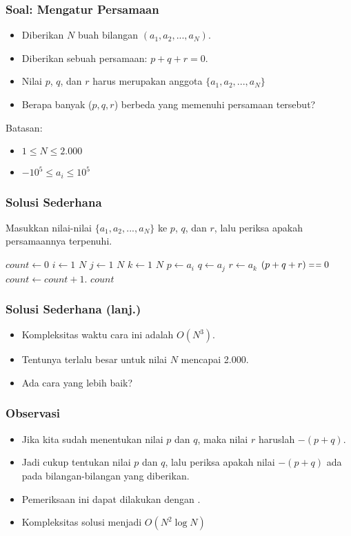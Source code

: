 \begin{frame}
\frametitle{Soal: Mengatur Persamaan}
\begin{itemize}
  \item Diberikan $N$ buah bilangan $(a_1, a_2, ..., a_N)$.
  \item Diberikan sebuah persamaan: $p + q + r = 0$.
  \item Nilai $p$, $q$, dan $r$ harus merupakan anggota $\{ a_1, a_2, ..., a_N \}$
  \item Berapa banyak ($p, q, r$) berbeda yang memenuhi persamaan tersebut?
\end{itemize}

Batasan:
\begin{itemize} 
  \item $1 \leq N \leq 2.000$
  \item $-10^5 \leq a_i \leq 10^5$
\end{itemize}
\end{frame}

\begin{frame}
\frametitle{Solusi Sederhana}
Masukkan nilai-nilai $\{ a_1, a_2, ..., a_N \}$ ke $p$, $q$, dan $r$, lalu periksa apakah persamaannya terpenuhi.

\begin{codebox}
\li $count \gets 0$
\li \For $i \gets 1$ \To $N$ \Do
\li   \For $j \gets 1$ \To $N$ \Do
\li     \For $k \gets 1$ \To $N$ \Do
\li       $p \gets a_i$
\li       $q \gets a_j$
\li       $r \gets a_k$
\li       \If $(p + q + r) \isequal 0$ \Then
\li         $count \gets count + 1$.
          \End
        \End
      \End
    \End
\li \Return $count$
\end{codebox}
\end{frame}

\begin{frame}
\frametitle{Solusi Sederhana (lanj.)}
\begin{itemize}
  \item Kompleksitas waktu cara ini adalah $O(N^3)$.
  \item Tentunya terlalu besar untuk nilai $N$ mencapai 2.000.
  \item Ada cara yang lebih baik?
\end{itemize}
\end{frame}

\begin{frame}
\frametitle{Observasi}
\begin{itemize}
  \item Jika kita sudah menentukan nilai $p$ dan $q$, maka nilai $r$ haruslah $-(p + q)$.
  \item Jadi cukup tentukan nilai $p$ dan $q$, lalu periksa apakah nilai $-(p + q)$ ada pada bilangan-bilangan yang diberikan.
  \item Pemeriksaan ini dapat dilakukan dengan \fBinarySearch.
  \item Kompleksitas solusi menjadi $O(N^2 \log{N})$
\end{itemize}
\end{frame}

